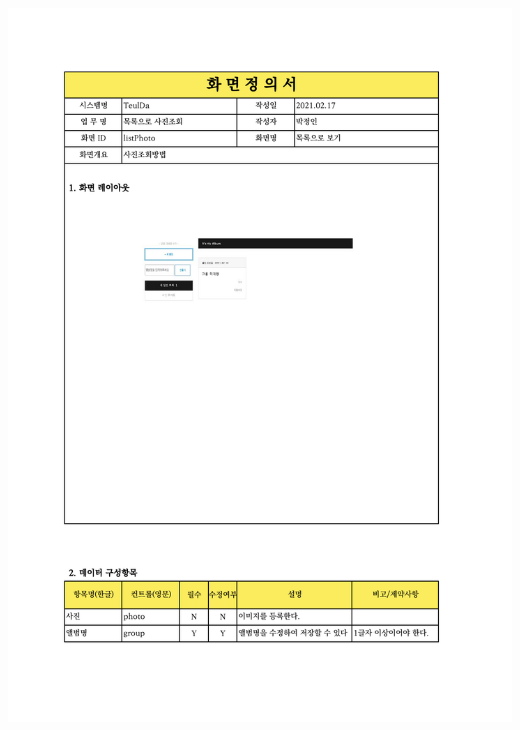 {{{{{{{{{{{{{{{{{{{{{{{{{{{{{{{{{{{{{{{{{{{{{\includegraphics[width=20cm]{./Figure/Design/Display/photo/photo_01.pdf} \\
}}}}}}}}}}}}}}}}}}}}}}}}}}}}}}}}}}}}}}}}}}}}}
